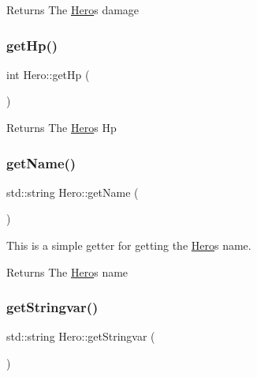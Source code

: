 \begin{DoxyReturn}{Returns}
The \hyperlink{classHero}{Hero}\textquotesingle{}s damage 
\end{DoxyReturn}
\mbox{\label{classHero_a7710500513b5197165e3d3c0b6402f07}} 
\subsubsection{\texorpdfstring{get\+Hp()}{getHp()}}
{\footnotesize\ttfamily int Hero\+::get\+Hp (\begin{DoxyParamCaption}{ }\end{DoxyParamCaption})}

\begin{DoxyReturn}{Returns}
The \hyperlink{classHero}{Hero}\textquotesingle{}s Hp 
\end{DoxyReturn}
\mbox{\label{classHero_ade246d363b9021a7e7aa811bb1410e6d}} 
\subsubsection{\texorpdfstring{get\+Name()}{getName()}}
{\footnotesize\ttfamily std\+::string Hero\+::get\+Name (\begin{DoxyParamCaption}{ }\end{DoxyParamCaption})}



This is a simple getter for getting the \hyperlink{classHero}{Hero}\textquotesingle{}s name. 

\begin{DoxyReturn}{Returns}
The \hyperlink{classHero}{Hero}\textquotesingle{}s name 
\end{DoxyReturn}
\mbox{\label{classHero_a031f8270dcbab7eed51b0dfb99ac62c4}} 
\subsubsection{\texorpdfstring{get\+Stringvar()}{getStringvar()}}
{\footnotesize\ttfamily std\+::string Hero\+::get\+Stringvar (\begin{DoxyParamCaption}{ }\end{DoxyParamCaption})}

